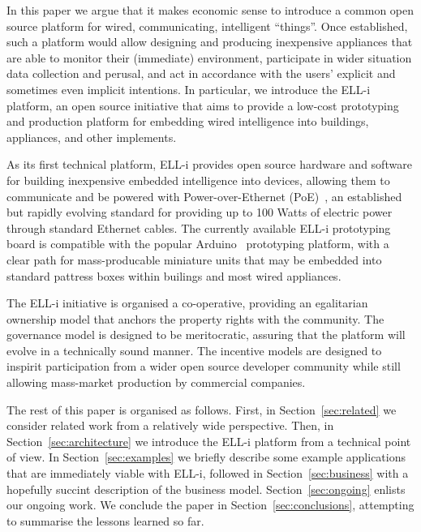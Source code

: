 \documentclass[final]{siamltex}
\begin{document}
In this paper we argue that it makes economic sense to introduce a
common open source platform for wired, communicating, intelligent
``things''.  Once established, such a platform would allow designing
and producing inexpensive appliances that are able to monitor their
(immediate) environment, participate in wider situation data
collection and perusal, and act in accordance with the users' explicit
and sometimes even implicit intentions.  In particular, we introduce
the ELL-i platform, an open source initiative that aims to provide a
low-cost prototyping and production platform for embedding wired
intelligence into buildings, appliances, and other implements.

As its first technical platform, ELL-i provides open source hardware
and software for building inexpensive embedded intelligence into
devices, allowing them to communicate and be powered with
Power-over-Ethernet (PoE)~\cite{PoE}, an established but rapidly
evolving standard for providing up to 100 Watts of electric power
through standard Ethernet cables.  The currently available ELL-i
prototyping board is compatible with the popular
Arduino~\cite{ArduinoProject} prototyping platform, with a clear path
for mass-producable miniature units that may be embedded into standard
pattress boxes within builings and most wired appliances.

The ELL-i initiative is organised a co-operative, providing an
egalitarian ownership model that anchors the property rights with the
community.  The governance model is designed to be meritocratic,
assuring that the platform will evolve in a technically sound manner.
The incentive models are designed to inspirit participation from a
wider open source developer community while still allowing mass-market
production by commercial companies.

The rest of this paper is organised as follows.  First, in
Section~\ref{sec:related} we consider related work from a relatively
wide perspective.  Then, in Section~\ref{sec:architecture} we
introduce the ELL-i platform from a technical point of view.  In
Section~\ref{sec:examples} we briefly describe some example
applications that are immediately viable with ELL-i, followed in
Section~\ref{sec:business} with a hopefully succint description of the
business model.  Section~\ref{sec:ongoing} enlists our ongoing work.
We conclude the paper in Section~\ref{sec:conclusions}, attempting to
summarise the lessons learned so far.
 
\end{document}
